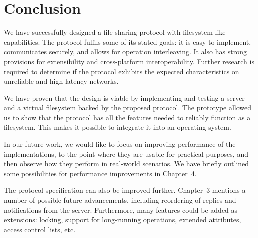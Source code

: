 
\chapter*{Conclusion}

We have successfully designed a file sharing protocol with filesystem-like capabilities. The protocol fulfils
some of its stated goals: it is easy to implement, communicates securely, and allows for operation
interleaving.  It also has strong provisions for extensibility and cross-platform interoperability.  Further
research is required to determine if the protocol exhibits the expected characteristics on unreliable and
high-latency networks.

We have proven that the design is viable by implementing and testing a server and a virtual filesystem backed
by the proposed protocol. The prototype allowed us to show that the protocol has all the features needed to
reliably function as a filesystem. This makes it possible to integrate it into an operating system.

In our future work, we would like to focus on improving performance of the implementations, to the point where
they are usable for practical purposes, and then observe how they perform in real-world scenarios. We have
briefly outlined some possibilities for performance improvements in Chapter~4.

The protocol specification can also be improved further. Chapter~3 mentions a number of possible future
advancements, including reordering of replies and notifications from the server. Furthermore, many features
could be added as extensions: locking, support for long-running operations, extended attributes, access
control lists, etc.
